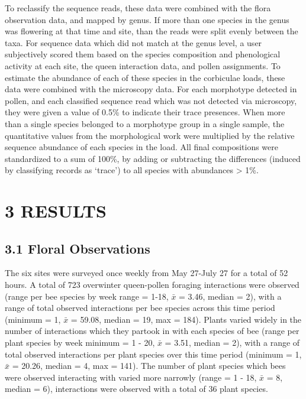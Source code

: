 \documentclass[
]{article}
\begin{document}
To reclassify the sequence reads, these data were combined with the
flora observation data, and mapped by genus. If more than one species in
the genus was flowering at that time and site, than the reads were split
evenly between the taxa. For sequence data which did not match at the
genus level, a user subjectively scored them based on the species
composition and phenological activity at each site, the queen
interaction data, and pollen assignments. To estimate the abundance of
each of these species in the corbiculae loads, these data were combined
with the microscopy data. For each morphotype detected in pollen, and
each classified sequence read which was not detected via microscopy,
they were given a value of 0.5\% to indicate their trace presences. When
more than a single species belonged to a morphotype group in a single
sample, the quantitative values from the morphological work were
multiplied by the relative sequence abundance of each species in the
load. All final compositions were standardized to a sum of 100\%, by
adding or subtracting the differences (induced by classifying records as
`trace') to all species with abundances \textgreater{} 1\%.

\hypertarget{results}{%
\section{3 \textbar{} RESULTS}\label{results}}

\hypertarget{floral-observations}{%
\subsection{3.1 \textbar{} Floral
Observations}\label{floral-observations}}

The six sites were surveyed once weekly from May 27-July 27 for a total
of 52 hours. A total of 723 overwinter queen-pollen foraging
interactions were observed (range per bee species by week range = 1-18,
\(\bar{x}\) = 3.46, median = 2), with a range of total observed
interactions per bee species across this time period (minimum = 1,
\(\bar{x}\) = 59.08, median = 19, max = 184). Plants varied widely in
the number of interactions which they partook in with each species of
bee (range per plant species by week minimum = 1 - 20, \(\bar{x}\) =
3.51, median = 2), with a range of total observed interactions per plant
species over this time period (minimum = 1, \(\bar{x}\) = 20.26, median
= 4, max = 141). The number of plant species which bees were observed
interacting with varied more narrowly (range = 1 - 18, \(\bar{x}\) = 8,
median = 6), interactions were observed with a total of 36 plant
species.
\end{document}

